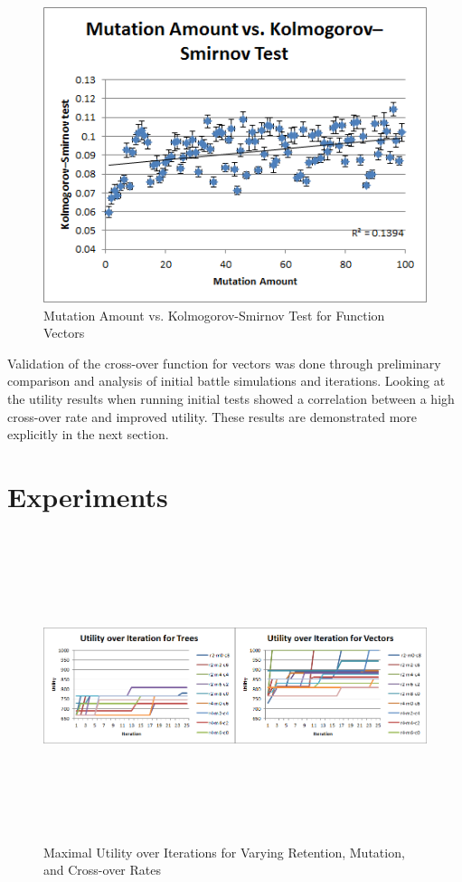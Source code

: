 \documentclass{acm_proc_article-sp}
\begin{document}
    \begin{figure}[h]
        \centering
        \includegraphics[width=\columnwidth]{./images/fv-mut-vs-ks-test.png}
        \caption{Mutation Amount vs. Kolmogorov-Smirnov Test for Function Vectors}
        \label{fv-mut-vs-ks-test}
    \end{figure}
    
    Validation of the cross-over function for vectors was done through preliminary comparison and analysis of initial battle simulations and iterations. Looking at the utility results when running initial tests showed a correlation between a high cross-over rate and improved utility. These results are demonstrated more explicitly in the next section.
    
    \section{Experiments}

\begin{figure}[ht!]
\centering
\includegraphics[width=\textwidth,height=90mm,keepaspectratio]{./images/gen-mureco-comparison.png}
\caption{Maximal Utility over Iterations for Varying Retention, Mutation, and Cross-over Rates}
\label{utility_experiments}
\end{figure}
    
\end{document}

